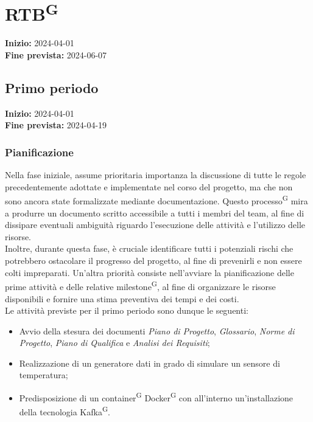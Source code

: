 \documentclass[8pt]{article}
\newcommand{\glossterm}[1]{#1\textsuperscript{G}} %
\begin{document}
\section{\glossterm{RTB}}
\textbf{Inizio:} 2024-04-01\\
\textbf{Fine prevista:} 2024-06-07
\subsection{Primo periodo} \label{sec:1_rtb}
\textbf{Inizio:} 2024-04-01\\
\textbf{Fine prevista:} 2024-04-19
\subsubsection{Pianificazione}
Nella fase iniziale, assume prioritaria importanza la discussione di tutte le regole precedentemente adottate e implementate nel corso del progetto, ma che non sono ancora state formalizzate mediante documentazione. Questo \glossterm{processo} mira a produrre un documento scritto accessibile a tutti i membri del team, al fine di dissipare eventuali ambiguità riguardo l'esecuzione delle attività e l'utilizzo delle risorse.
\\
Inoltre, durante questa fase, è cruciale identificare tutti i potenziali rischi che potrebbero ostacolare il progresso del progetto, al fine di prevenirli e non essere colti impreparati. Un'altra priorità consiste nell'avviare la pianificazione delle prime attività e delle relative \glossterm{milestone}, al fine di organizzare le risorse disponibili e fornire una stima preventiva dei tempi e dei costi. \\
Le attività previste per il primo periodo sono dunque le seguenti:
\begin{itemize}
\setlength{\itemsep}{0em}
    \item Avvio della stesura dei documenti \textit{Piano di Progetto}, \textit{Glossario}, \textit{Norme di Progetto}, \textit{Piano di Qualifica} e \textit{Analisi dei Requisiti};
    \item Realizzazione di un generatore dati in grado di simulare un sensore di temperatura;
    \item Predisposizione di un \glossterm{container} \glossterm{Docker} con all'interno un'installazione della tecnologia \glossterm{Kafka}.
\end{itemize}
\end{document}
